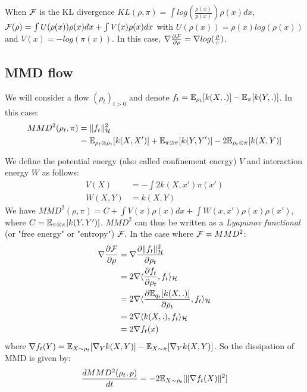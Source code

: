 \begin{remark} When ${{\mathcal F}}$ is the KL divergence $KL(\rho,\pi)=\int log(\frac{\rho(x)}{p(x)})\rho(x)dx$, ${{\mathcal F}}(\rho)=\int U(\rho(x))\rho(x)dx + \int V(x) \rho(x)dx$ with $U(\rho(x))=\rho(x)log(\rho(x))$ and $V(x)=-log(\pi(x))$. In this case, $\nabla \frac{\partial {{\mathcal F}}}{\partial \rho}= \nabla log(\frac{\rho}{\pi})$.
\end{remark}

\subsection{MMD flow}

We will consider a flow $(\rho_t)_{t>0}$ and denote $f_t= {{\mathbb E}}_{\rho_t}[k(X,.)]- {{\mathbb E}}_{\pi}[k(Y,.)]$. In this case:
\begin{align}
MMD^2(\rho_t,\pi)&=\|f_t\|^2_{{{\mathcal H}}}\\
&= {{\mathbb E}}_{\rho_t \otimes \rho_t}[k(X,X')]+{{\mathbb E}}_{\pi \otimes \pi}[k(Y,Y')] - 2{{\mathbb E}}_{\rho_t \otimes \pi}[k(X,Y)]
\end{align} 

We define the potential energy (also called confinement energy) $V$ and interaction energy $W$ as follows:
\begin{align}
V(X)&=-\int 2 k(X,x')\pi(x')\\
W(X,Y)&=k(X,Y)
\end{align}
We have $MMD^2(\rho,\pi)=C+ \int V(x) \rho(x)dx + \int W(x,x')\rho(x)\rho(x')$, where $C={{\mathbb E}}_{\pi\otimes \pi}[k(Y,Y')]$. $MMD^2$ can thus be written as a \textit{Lyapunov functional} (or "free energy" or "entropy") ${{\mathcal F}}$.
In the case where ${{\mathcal F}}=MMD^2$:
\begin{align}
\nabla \frac{\partial {{\mathcal F}}}{\partial \rho}&= \nabla \frac{\partial \|f_t\|^2_{{{\mathcal H}}}}{\partial \rho_t}\\
&=2 \nabla \langle \frac{\partial f_t}{\partial \rho_t}, f_t \rangle_{{{\mathcal H}}}\\
&=2 \nabla \langle \frac{\partial {{\mathbb E}}_{q_t}[k(X,.)]}{\partial \rho_t}, f_t \rangle_{{{\mathcal H}}}\\
&=2 \nabla \langle k(X,.), f_t \rangle_{{{\mathcal H}}}\\
&= 2 \nabla f_t(x)
\end{align}
where $\nabla f_t(Y)= {{\mathbb E}}_{X \sim \rho_t}[\nabla_{Y}k(X,Y)] -  {{\mathbb E}}_{X \sim \pi}[\nabla_{Y}k(X,Y)]$. So the dissipation of MMD is given by:  
\begin{equation}
\frac{d MMD^2(\rho_t, p)}{dt}=-2 {{\mathbb E}}_{X \sim \rho_t}[\|\nabla f_t(X)\|^2]
\end{equation}

